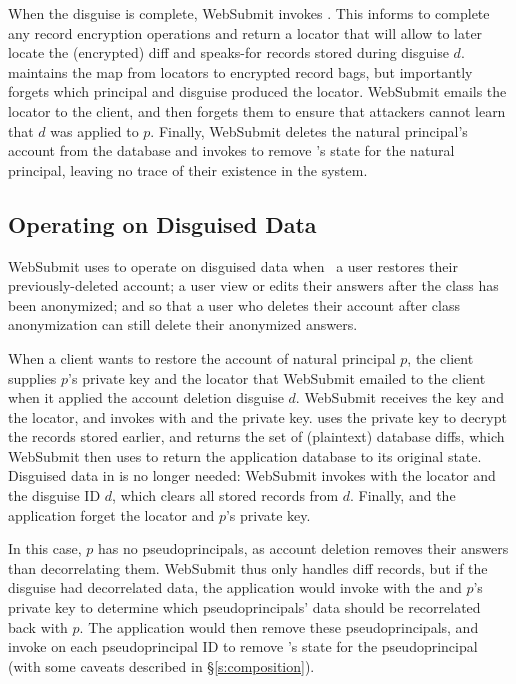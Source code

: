 %
When the disguise is complete, WebSubmit invokes .
%
This informs \sys to complete any record encryption operations and return a
locator  that will allow \sys to later locate the (encrypted) diff and
speaks-for records stored during disguise $d$.
%
\sys maintains the map from locators to encrypted record bags, but importantly
forgets which principal and disguise produced the locator.
%
WebSubmit emails the locator to the client, and then forgets them to ensure
that attackers cannot learn that $d$ was applied to $p$.
%
Finally, WebSubmit deletes the natural principal's account from the database and
invokes  to remove \sys's state for the natural principal,
leaving no trace of their existence in the system.
%

\subsection{Operating on Disguised Data}
\label{s:op-disg}

%
WebSubmit uses \sys to operate on disguised data when \one{} a user restores their
previously-deleted account; \two{} a user view or edits their answers after the
class has been anonymized; and \three{} so that a user who deletes their account
after class anonymization can still delete their anonymized answers.
%

%
When a client wants to restore the account of natural principal $p$, the client
supplies $p$'s private key and the locator  that WebSubmit emailed to
the client when it applied the account deletion disguise $d$.
%
WebSubmit receives the key and the locator, and invokes  with
 and the private key.
%
\sys uses the private key to decrypt the records stored earlier, and returns the
set of (plaintext) database diffs, which WebSubmit then uses to return the
application database to its original state.
%
Disguised data in \sys is no longer needed: WebSubmit invokes  with
the locator and the disguise ID $d$, which clears all stored records from $d$.
%
Finally, \sys and the application forget the locator and $p$'s private key.
%

%
In this case, $p$ has no pseudoprincipals, as account deletion removes their
answers than decorrelating them.
%
WebSubmit thus only handles diff records, but if the disguise had decorrelated
data, the application would invoke  with the 
and $p$'s private key to determine which pseudoprincipals' data should be
recorrelated back with $p$.
%
The application would then remove these pseudoprincipals, and invoke
 on each pseudoprincipal ID to remove \sys's state for the
pseudoprincipal (with some caveats described in \S\ref{s:composition}).


